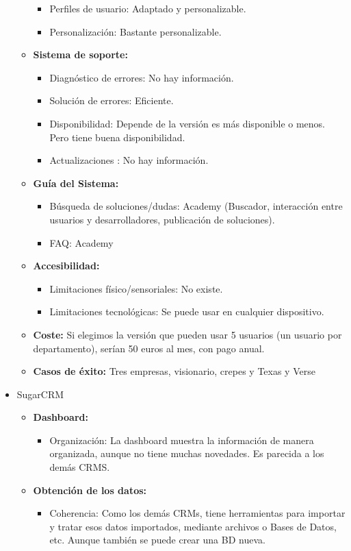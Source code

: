 \documentclass{article}
\begin{document}
\begin{itemize}
\begin{itemize}
\begin{itemize}
\item Perfiles de usuario: Adaptado y personalizable. 
\item Personalización: Bastante personalizable.
\end{itemize}
\item \textbf{Sistema de soporte:}
\begin{itemize}
\item Diagnóstico de errores: No hay información. 
\item Solución de errores: Eficiente.         
\item Disponibilidad: Depende de la versión es más disponible o menos. Pero tiene buena disponibilidad. 
\item Actualizaciones : No hay información.
\end{itemize}
\item \textbf{Guía del Sistema:}
\begin{itemize}
\item Búsqueda de soluciones/dudas: Academy (Buscador, interacción entre usuarios y desarrolladores, publicación de soluciones). 
\item FAQ: Academy
\end{itemize}
\item \textbf{Accesibilidad:}
\begin{itemize}
\item Limitaciones físico/sensoriales: No existe. 
\item Limitaciones tecnológicas:  Se puede usar en cualquier dispositivo. 
\end{itemize}
\item \textbf{Coste:} Si elegimos la versión que pueden usar 5 usuarios (un usuario por departamento), serían 50 euros al mes, con pago anual.
\item \textbf{Casos de éxito:} Tres empresas, visionario, crepes y Texas y Verse
\end{itemize}
\item SugarCRM
\begin{itemize}
\item \textbf{Dashboard:} 
\begin{itemize}
\item Organización: La dashboard muestra la información de manera organizada, aunque no tiene muchas novedades. Es parecida a los demás CRMS.  
\end{itemize}
\item \textbf{Obtención de los datos:}
\begin{itemize}
\item Coherencia: Como los demás CRMs, tiene herramientas para importar y tratar esos datos importados, mediante archivos o Bases de Datos, etc. Aunque también se puede crear una BD nueva. 

\end{itemize}
\end{itemize}
\end{itemize}
\end{document}
